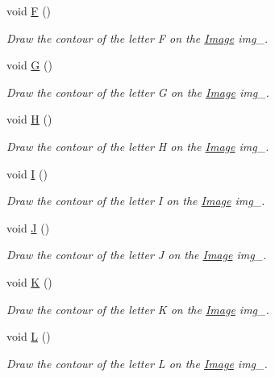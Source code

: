 \begin{DoxyCompactItemize}
void \mbox{\hyperlink{class_font_v1_a40dd925bee9092d13ba1a00546cc7160}{F}} ()
\begin{DoxyCompactList}\small\item\em Draw the contour of the letter F on the \mbox{\hyperlink{class_image}{Image}} img\+\_\+. \end{DoxyCompactList}\item 
void \mbox{\hyperlink{class_font_v1_a9806041ba05556826ba6b4a0760fcee4}{G}} ()
\begin{DoxyCompactList}\small\item\em Draw the contour of the letter G on the \mbox{\hyperlink{class_image}{Image}} img\+\_\+. \end{DoxyCompactList}\item 
void \mbox{\hyperlink{class_font_v1_aac6c3d7f8116c21fd9339d07aa63a797}{H}} ()
\begin{DoxyCompactList}\small\item\em Draw the contour of the letter H on the \mbox{\hyperlink{class_image}{Image}} img\+\_\+. \end{DoxyCompactList}\item 
void \mbox{\hyperlink{class_font_v1_aab86d5ae867a26e0384c919f82f0bcf1}{I}} ()
\begin{DoxyCompactList}\small\item\em Draw the contour of the letter I on the \mbox{\hyperlink{class_image}{Image}} img\+\_\+. \end{DoxyCompactList}\item 
void \mbox{\hyperlink{class_font_v1_a3fe315f13fd21c6dbd5f81113cd1c3f6}{J}} ()
\begin{DoxyCompactList}\small\item\em Draw the contour of the letter J on the \mbox{\hyperlink{class_image}{Image}} img\+\_\+. \end{DoxyCompactList}\item 
void \mbox{\hyperlink{class_font_v1_a45ed7d1ac12bd32f458b5b144dd132ba}{K}} ()
\begin{DoxyCompactList}\small\item\em Draw the contour of the letter K on the \mbox{\hyperlink{class_image}{Image}} img\+\_\+. \end{DoxyCompactList}\item 
void \mbox{\hyperlink{class_font_v1_a17ba426bfb42af35ea882ab3beeba734}{L}} ()
\begin{DoxyCompactList}\small\item\em Draw the contour of the letter L on the \mbox{\hyperlink{class_image}{Image}} img\+\_\+. \end{DoxyCompactList}\item 

\end{DoxyCompactItemize}
